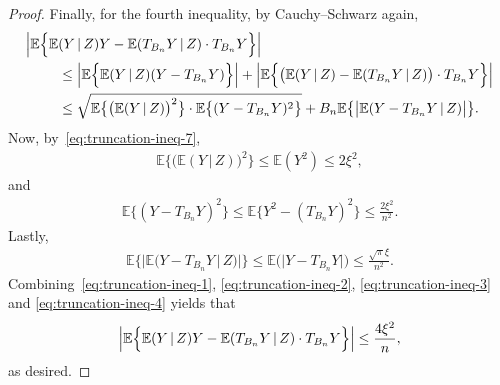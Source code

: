 \documentclass[10pt,a4paper]{amsart}
\begin{document}
\begin{proof}
    Finally, for the fourth inequality, by Cauchy--Schwarz again,
    \begin{align}
        \Bigl|\mathbb{E}\Bigl\{\mathbb{E}&(Y\,|\,Z)Y - \mathbb{E}(T_{B_n}Y\,|\,Z) \cdot T_{B_n}Y\Bigr\}\Bigr|\nonumber\\
        &\leq \Bigl|\mathbb{E}\Bigl\{\mathbb{E}(Y\,|\,Z)(Y-T_{B_n}Y)\Bigr\}\Bigr| + \Bigl|\mathbb{E}\Bigl\{\bigl( \mathbb{E}(Y\,|\,Z)-\mathbb{E}(T_{B_n}Y\,|\,Z) \bigr) \cdot T_{B_n}Y\Bigr\}\Bigr| \nonumber\\
        &\leq \sqrt{\mathbb{E}\bigl\{\bigl(\mathbb{E}(Y\,|\,Z)\bigr)^2\bigr\}\cdot \mathbb{E}\bigl\{(Y-T_{B_n}Y)^2\bigr\}} + B_n \mathbb{E}\bigl\{ \bigl| \mathbb{E}(Y - T_{B_n}Y\,|\,Z) \bigr| \bigr\}. \label{eq:truncation-ineq-1}
    \end{align}
    Now, by~\eqref{eq:truncation-ineq-7},
    \begin{align}
        \mathbb{E}\bigl\{\bigl(\mathbb{E}(Y\,|\,Z)\bigr)^2\bigr\} \leq \mathbb{E}(Y^2) \leq 2\xi^2, \label{eq:truncation-ineq-2}
    \end{align} 
    and
    \begin{align}
        \mathbb{E}\bigl\{(Y-T_{B_n}Y)^2\bigr\} \leq \mathbb{E}\bigl\{Y^2-(T_{B_n}Y)^2\bigr\} \leq \frac{2\xi^2}{n^2}. \label{eq:truncation-ineq-3}
    \end{align}
    Lastly,
    \begin{align}
        \mathbb{E}\bigl\{ \bigl| \mathbb{E}(Y - T_{B_n}Y\,|\,Z) \bigr| \bigr\} \leq \mathbb{E}\bigl(|Y - T_{B_n}Y|\bigr) \leq \frac{\sqrt{\pi}\xi}{n^2}. \label{eq:truncation-ineq-4}
    \end{align}
    Combining~\eqref{eq:truncation-ineq-1}, \eqref{eq:truncation-ineq-2}, \eqref{eq:truncation-ineq-3} and \eqref{eq:truncation-ineq-4} yields that
    \begin{align*}
        \Bigl|\mathbb{E}\Bigl\{\mathbb{E}(Y\,|\,Z)Y - \mathbb{E}(T_{B_n}Y\,|\,Z) \cdot T_{B_n}Y\Bigr\}\Bigr| \leq \frac{4\xi^2}{n},
    \end{align*}
    as desired.
\end{proof}
\end{document}
